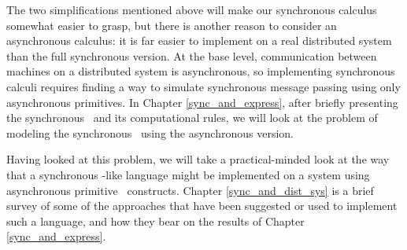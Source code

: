 The two simplifications mentioned above will make our synchronous calculus somewhat easier to grasp, but there is another reason to consider an asynchronous calculus: it is far easier to implement on a real distributed system than the full synchronous version.  At the base level, communication between machines on a distributed system is asynchronous, so implementing synchronous calculi requires finding a way to simulate synchronous message passing using only asynchronous primitives.  In Chapter \ref{sync_and_express}, after briefly presenting the synchronous \picalc\ and its computational rules, we will look at the problem of modeling the synchronous \picalc\ using the asynchronous version.

Having looked at this problem, we will take a practical-minded look at the way that a synchronous \picalc-like language might be implemented on a system using asynchronous primitive \picalc\ constructs. Chapter \ref{sync_and_dist_sys} is a brief survey of some of the approaches that have been suggested or used to implement such a language, and how they bear on the results of Chapter \ref{sync_and_express}.